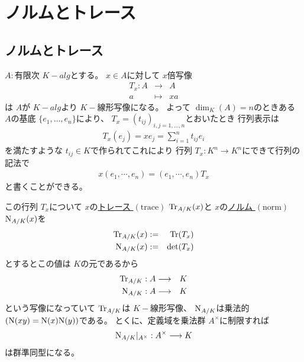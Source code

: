 \documentclass[../master_galois_theory]{subfiles}
\begin{document}
\setcounter{section}{9}

\section{ノルムとトレース}

\subsection{ノルムとトレース}

\begin{defi}
  $A:$有限次 $K-alg$とする。
  $x \in A$に対して $x$倍写像
  \begin{eqnarray*}
    T_x : A & \longrightarrow & A \\
    a & \longmapsto & xa
  \end{eqnarray*}
  は $A$が $K-alg$より $K-$線形写像になる。
  よって $\dim_K(A) = n$のときある $A$の基底 $\{ e_1 , \dots , e_n \}$により、 $T_x = (t_{ij})_{i,j = 1 , \dots , n}$とおいたとき
  行列表示は
  \begin{eqnarray*}
    T_x (e_j) = x e_j = \sum_{i=1}^n t_{ij} e_i
  \end{eqnarray*}
  を満たすような $t_{ij} \in K$で作られてこれにより
  行列 $T_x : K^n \longrightarrow K^n$にできて行列の記法で
  \begin{eqnarray*}
    x(e_1 , \cdots , e_n) = (e_1 , \cdots , e_n) T_x
  \end{eqnarray*}
  と書くことができる。

  この行列 $T_x$について
  $x$の\underline{トレース $(\mathrm{trace})$} $\mathrm{Tr}_{A/K}(x)$と
  $x$の\underline{ノルム $(\mathrm{norm})$} $\mathrm{N}_{A/K}(x)$を
  \begin{eqnarray*}
    \mathrm{Tr}_{A/K}(x) & := & \mathrm{Tr}(T_x) \\
    \mathrm{N}_{A/K}(x) & := & \det(T_x)
  \end{eqnarray*}
  とするとこの値は $K$の元であるから
  \begin{eqnarray*}
    \mathrm{Tr}_{A/K} : A & \longrightarrow & K \\
    \mathrm{N}_{A/K} : A & \longrightarrow & K
  \end{eqnarray*}
  という写像になっていて
  $\mathrm{Tr}_{A/K}$は $K-$線形写像、 $\mathrm{N}_{A/K}$は乗法的 $(\mathrm{N}(xy) = \mathrm{N}(x) \mathrm{N}(y))$である。
  とくに、定義域を乗法群 $A^\times$に制限すれば
  \begin{eqnarray*}
    \mathrm{N}_{A/K}|_{A^\times} : A^\times \longrightarrow K
  \end{eqnarray*}
  は群準同型になる。
\end{defi}
\end{document}
